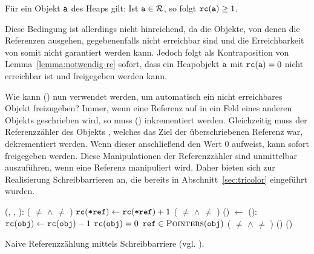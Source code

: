 \begin{mybox}
\begin{lemma}
\label{lemma:notwendig-rc}
	Für ein Objekt $\texttt{a}$ des Heaps gilt: Ist $\texttt{a} \in \mathcal{R}$, so folgt $\texttt{rc}(\texttt{a}) \geq 1$.
\end{lemma}
\end{mybox}

Diese Bedingung ist allerdings nicht hinreichend, da die Objekte, von denen die Referenzen ausgehen, gegebenenfalls nicht erreichbar sind und die Erreichbarkeit von  somit nicht garantiert werden kann.
Jedoch folgt als Kontraposition von Lemma~\ref{lemma:notwendig-rc} sofort, dass ein Heapobjekt $\texttt{a}$ mit $\texttt{rc}(\texttt{a}) = 0$ nicht erreichbar ist und freigegeben werden kann.

Wie kann () nun verwendet werden, um automatisch ein nicht erreichbares Objekt freizugeben?
Immer, wenn eine Referenz auf  in ein Feld eines anderen Objekts geschrieben wird, so muss () inkrementiert werden.
Gleichzeitig muss der Referenzzähler des Objekts , welches das Ziel der überschriebenen Referenz war, dekrementiert werden.
Wenn dieser anschließend den Wert $0$ aufweist, kann  sofort freigegeben werden.
Diese Manipulationen der Referenzzähler sind unmittelbar auszuführen, wenn eine Referenz manipuliert wird.
Daher bieten sich zur Realisierung Schreibbarrieren an, die bereits in Abschnitt~\ref{sec:tricolor} eingeführt wurden.

\begin{algorithm}[h]
\begin{algorithmic}[1]
	\State \Atomic {}(, , ):
	\State \quad \IF ( $\neq$ \Null $\wedge$  $\neq$ )	
	\State \quad \quad $\texttt{rc}(\texttt{*ref}) \gets \texttt{rc}(\texttt{*ref}) + 1$ 
	\State \quad \IF ( $\neq$ \Null $\wedge$  $\neq$ )	
	\State \quad \quad {}()	
	\State \quad {} $\gets$ 
	\Statex
	\State {}():
	\State \quad $\texttt{rc}(\texttt{obj}) \gets \texttt{rc}(\texttt{obj}) - 1$
	\State \quad \IF $\texttt{rc}(\texttt{obj}) = 0$
	\State \quad \quad \FOREACH $\texttt{ref} \in \textsc{Pointers}(\texttt{obj})$
	\State \quad \quad \quad \IF ( $\neq$ \Null $\wedge$  $\neq$ ) 
	\State \quad \quad \quad \quad {}() 
	\State \quad \quad {}()
\end{algorithmic}
\caption[Naive Referenzzählung]{Naive Referenzzählung mittels Schreibbarriere (vgl. \cite[S. 58]{handbook}).}
\label{algo:naive-rc}
\end{algorithm}

